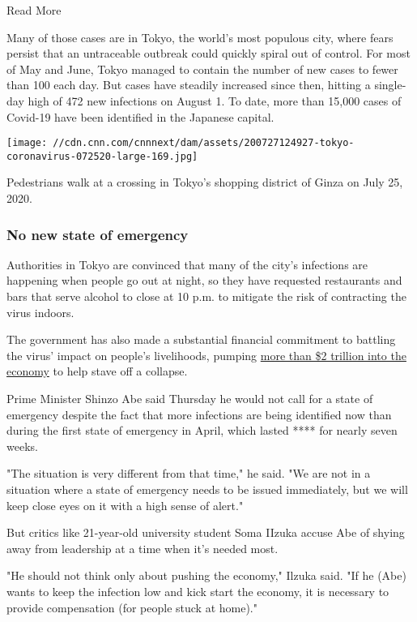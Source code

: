 Read More

Many of those cases are in Tokyo, the world's most populous city, where
fears persist that an untraceable outbreak could quickly spiral out of
control. For most of May and June, Tokyo managed to contain the number
of new cases to fewer than 100 each day. But cases have steadily
increased since then, hitting a single-day high of 472 new infections on
August 1. To date, more than 15,000 cases of Covid-19 have been
identified in the Japanese capital.

\texttt{[image: //cdn.cnn.com/cnnnext/dam/assets/200727124927-tokyo-coronavirus-072520-large-169.jpg]}

Pedestrians walk at a crossing in Tokyo's shopping district of Ginza on
July 25, 2020.

\hypertarget{no-new-state-of-emergency}{%
\subsubsection{No new state of
emergency}\label{no-new-state-of-emergency}}

Authorities in Tokyo are convinced that many of the city's infections
are happening when people go out at night, so they have requested
restaurants and bars that serve alcohol to close at 10 p.m. to mitigate
the risk of contracting the virus indoors.

The government has also made a substantial financial commitment to
battling the virus' impact on people's livelihoods, pumping
\href{https://www.cnn.com/2020/05/27/economy/japan-economic-stimulus-coronavirus/index.html}{more
than \$2 trillion into the economy} to help stave off a collapse.

Prime Minister Shinzo Abe said Thursday he would not call for a state of
emergency despite the fact that more infections are being identified now
than during the first state of emergency in April, which lasted **** for
nearly seven weeks.

"The situation is very different from that time," he said. "We are not
in a situation where a state of emergency needs to be issued
immediately, but we will keep close eyes on it with a high sense of
alert."

But critics like 21-year-old university student Soma IIzuka accuse Abe
of shying away from leadership at a time when it's needed most.

"He should not think only about pushing the economy," Ilzuka said. "If
he (Abe) wants to keep the infection low and kick start the economy, it
is necessary to provide compensation (for people stuck at home)."

